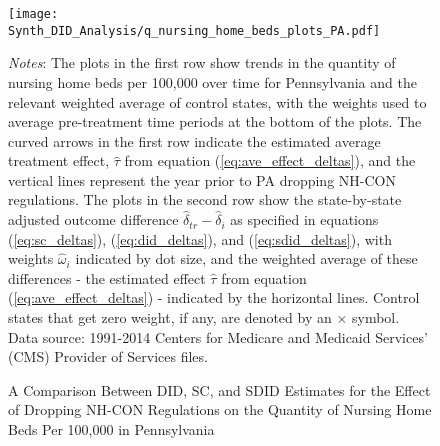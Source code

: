 \documentclass[../Main.tex]{subfiles}
\begin{document}
\newpage
\begin{figure}[t] 
	\begin{center}
	\caption{\label{fig:q_nhb_plots_pa} \centering A Comparison Between DID, SC, and SDID Estimates for the Effect of Dropping NH-CON Regulations on the Quantity of Nursing Home Beds Per 100,000 in Pennsylvania}
    \texttt{[image: Synth\_DID\_Analysis/q\_nursing\_home\_beds\_plots\_PA.pdf]}
    \end{center}
    \footnotesize
		\textit{Notes}: The plots in the first row show trends in the quantity of nursing home beds per 100,000 over time for Pennsylvania and the relevant weighted average of control states, with the weights used to average pre-treatment time periods at the bottom of the plots. The curved arrows in the first row indicate the estimated average treatment effect, $\hat{\tau}$ from equation (\ref{eq:ave_effect_deltas}), and the vertical lines represent the year prior to PA dropping NH-CON regulations. The plots in the second row show the state-by-state adjusted outcome difference $\hat{\delta}_{tr}-\hat{\delta}_i$ as specified in equations (\ref{eq:sc_deltas}), (\ref{eq:did_deltas}), and (\ref{eq:sdid_deltas}), with weights $\hat{\omega}_i$ indicated by dot size, and the weighted average of these differences - the estimated effect $\hat{\tau}$ from equation (\ref{eq:ave_effect_deltas}) - indicated by the horizontal lines. Control states that get zero weight, if any, are denoted by an $\times$ symbol. Data source: 1991-2014 Centers for Medicare and Medicaid Services’ (CMS) Provider of Services files.
\end{figure}
\clearpage
\end{document}
